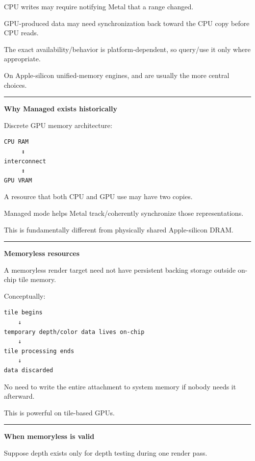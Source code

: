 CPU writes may require notifying Metal that a range changed.

GPU-produced data may need synchronization back toward the CPU copy before CPU reads.

The exact availability/behavior is platform-dependent, so query/use it only where appropriate.

On Apple-silicon unified-memory engines,  and  are usually the more central choices.

\begin{center}\rule{0.5\linewidth}{0.5pt}\end{center}

\textbf{Why Managed exists historically}

Discrete GPU memory architecture:

\begin{verbatim}
CPU RAM
     ↕
interconnect
     ↕
GPU VRAM
\end{verbatim}

A resource that both CPU and GPU use may have two copies.

Managed mode helps Metal track/coherently synchronize those representations.

This is fundamentally different from physically shared Apple-silicon DRAM.

\begin{center}\rule{0.5\linewidth}{0.5pt}\end{center}

\textbf{Memoryless resources}

A memoryless render target need not have persistent backing storage outside on-chip tile memory.

Conceptually:

\begin{verbatim}
tile begins
    ↓
temporary depth/color data lives on-chip
    ↓
tile processing ends
    ↓
data discarded
\end{verbatim}

No need to write the entire attachment to system memory if nobody needs it afterward.

This is powerful on tile-based GPUs.

\begin{center}\rule{0.5\linewidth}{0.5pt}\end{center}

\textbf{When memoryless is valid}

Suppose depth exists only for depth testing during one render pass.

